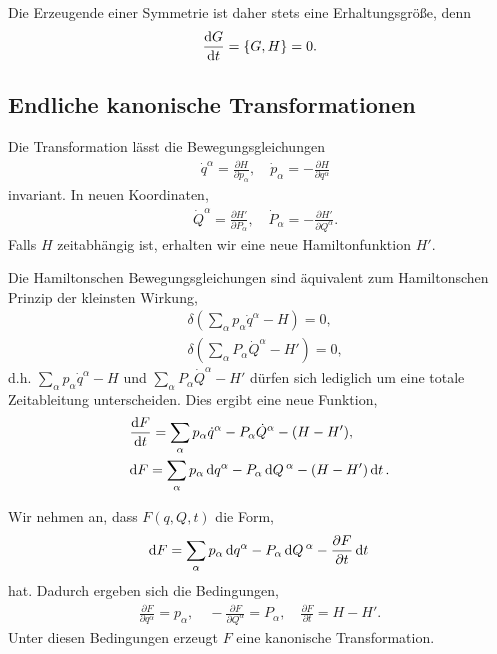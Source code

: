 Die Erzeugende einer Symmetrie ist daher stets eine Erhaltungsgröße, denn
\begin{align*}
\frac{\mathrm{d} G}{\,\mathrm{d} t\,} = \left\{ G,H \right\} = 0.
\end{align*}

\subsection{Endliche kanonische Transformationen}

Die Transformation lässt die Bewegungsgleichungen
\begin{align*}
&\dot{q}^\alpha = \frac{\partial H}{\partial p_\alpha},\quad
\dot{p}_\alpha = -\frac{\partial H}{\partial q^\alpha}
\end{align*}
invariant. In neuen Koordinaten,
\begin{align*}
&\dot{Q}^\alpha = \frac{\partial H'}{\partial P_\alpha},\quad
\dot{P}_\alpha = -\frac{\partial H'}{\partial Q^\alpha}.
\end{align*}
Falls $H$ zeitabhängig ist, erhalten wir eine neue Hamiltonfunktion $H'$.

Die Hamiltonschen Bewegungsgleichungen sind äquivalent zum Hamiltonschen
Prinzip der kleinsten Wirkung,
\begin{align*}
&\delta\left(\sum_\alpha p_\alpha\dot{q}^\alpha - H\right) = 0,\\
&\delta\left(\sum_\alpha P_\alpha\dot{Q}^\alpha - H'\right) = 0,
\end{align*}
d.h. $\sum_\alpha p_\alpha\dot{q}^\alpha - H$ und $\sum_\alpha
P_\alpha\dot{Q}^\alpha - H'$ dürfen sich lediglich um eine totale
Zeitableitung unterscheiden. Dies ergibt eine neue Funktion,
\begin{align*}
&\frac{\mathrm{d} F}{\,\mathrm{d} t\,} = \sum_\alpha p_\alpha \dot{q}^\alpha -
P_\alpha\dot{Q}^\alpha - (H-H'),\\
&\mathrm{d} F = \sum_\alpha p_\alpha \,\mathrm{d} q^\alpha -
P_\alpha\,\mathrm{d} Q\,^\alpha - (H-H')\,\mathrm{d} t\,.
\end{align*}

Wir nehmen an, dass $F(q,Q,t)$ die Form,
\begin{align*}
\mathrm{d} F = \sum_\alpha p_\alpha \,\mathrm{d} q^\alpha -
P_\alpha\,\mathrm{d} Q\,^\alpha - \frac{\partial F}{\partial t}\,\mathrm{d} t\,
\end{align*}
hat. Dadurch ergeben sich die Bedingungen,
\begin{align*}
\frac{\partial F}{\partial q^\alpha} = p_\alpha,\quad
-\frac{\partial F}{\partial Q^\alpha} = P_\alpha,\quad
\frac{\partial F}{\partial t} = H-H'.
\end{align*}
Unter diesen Bedingungen erzeugt $F$ eine kanonische Transformation.

